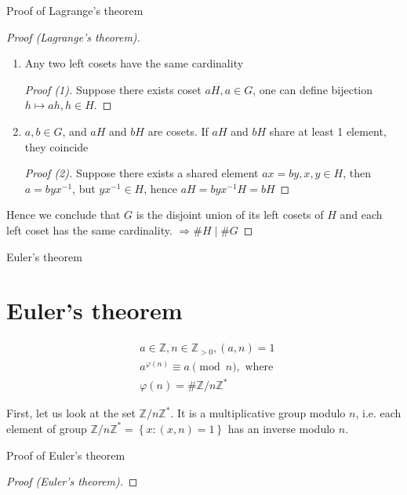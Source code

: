 \documentclass{beamer}
\begin{document}
\begin{frame}{Proof of Lagrange's theorem}
	\begin{proof}[Proof (Lagrange's theorem)]
		\begin{enumerate}
			\item Any two left cosets have the same cardinality
			\begin{proof}[Proof (1)]
				Suppose there exists coset $aH, a \in G$, one can define bijection $h \mapsto ah, h \in H$.
			\end{proof}
			\item $a, b \in G$, and $aH$ and $bH$ are cosets. If $aH$ and $bH$ share at least 1 element, they coincide
			\begin{proof}[Proof (2)]
			Suppose there exists a shared element $ax = by, x,y \in H$, then $a = byx^{-1}$, but $yx^{-1} \in H$, hence
			$aH = byx^{-1}H = bH$
			\end{proof}
		\end{enumerate}
		Hence we conclude that $G$ is the disjoint union of its left cosets of $H$ and each left coset has the same 
		cardinality. \newline
		$\Rightarrow \# H \mid \# G$
	\end{proof}
\end{frame}

\begin{frame}{Euler's theorem}
	\section{Euler's theorem}
	\begin{Theorem}
		\begin{align*}
			& a \in \mathbb{Z}, n \in \mathbb{Z}_{>0}, (a, n) = 1 \\
			& a^{\varphi(n)} \equiv a \pmod n, \text{ where } \\
			& \varphi(n) = \# \mathbb{Z} / n \mathbb{Z}^*
		\end{align*}
    \end{Theorem}
	First, let us look at the set $\mathbb{Z} / n \mathbb{Z}^*$. It is a multiplicative group modulo $n$, i.e. 
	each element of group $\mathbb{Z} / n \mathbb{Z}^* = \left\{ x : (x, n) = 1 \right\}$ has an inverse modulo $n$.
\end{frame}

\begin{frame}{Proof of Euler's theorem}
	\begin{proof}[Proof (Euler's theorem)]
		
	\end{proof}
\end{frame}
\end{document}
